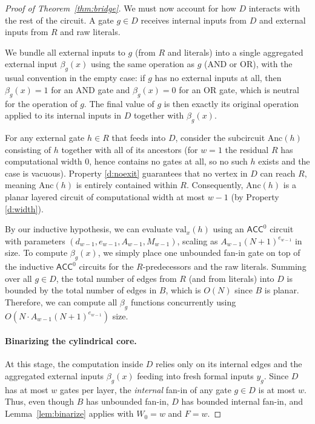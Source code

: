 \documentclass[11pt]{article}
\theoremstyle{definition}
\theoremstyle{remark}
\newcommand{\ACC}{\mathsf{ACC}^0}
\begin{document}
\begin{proof}[Proof of Theorem~\ref{thm:bridge}]
We must now account for how $D$ interacts with the rest of the circuit. A gate $g \in D$ receives internal inputs from $D$ and external inputs from $R$ and raw literals.

We bundle all external inputs to $g$ (from $R$ and literals) into a single aggregated external input $\beta_g(x)$ using the same operation as $g$ ($\mathrm{AND}$ or $\mathrm{OR}$), with the usual convention in the empty case: if $g$ has no external inputs at all, then $\beta_g(x)=1$ for an $\mathrm{AND}$ gate and $\beta_g(x)=0$ for an $\mathrm{OR}$ gate, which is neutral for the operation of $g$. The final value of $g$ is then exactly its original operation applied to its internal inputs in $D$ together with $\beta_g(x)$.

For any external gate $h \in R$ that feeds into $D$, consider the subcircuit $\mathrm{Anc}(h)$ consisting of $h$ together with all of its ancestors (for $w=1$ the residual $R$ has computational width $0$, hence contains no gates at all, so no such $h$ exists and the case is vacuous). Property \ref{d:noexit} guarantees that no vertex in $D$ can reach $R$, meaning $\mathrm{Anc}(h)$ is entirely contained within $R$. Consequently, $\mathrm{Anc}(h)$ is a planar layered circuit of computational width at most $w-1$ (by Property \ref{d:width}).

By our inductive hypothesis, we can evaluate $\mathrm{val}_x(h)$ using an $\ACC$ circuit with parameters $(d_{w-1},e_{w-1},A_{w-1},M_{w-1})$, scaling as $A_{w-1}(N+1)^{e_{w-1}}$ in size.
To compute $\beta_g(x)$, we simply place one unbounded fan-in gate on top of the inductive $\ACC$ circuits for the $R$-predecessors and the raw literals. Summing over all $g \in D$, the total number of edges from $R$ (and from literals) into $D$ is bounded by the total number of edges in $B$, which is $O(N)$ since $B$ is planar. Therefore, we can compute all $\beta_g$ functions concurrently using $O\left(N \cdot A_{w-1}(N+1)^{e_{w-1}}\right)$ size.

\paragraph{Binarizing the cylindrical core.}

At this stage, the computation inside $D$ relies only on its internal edges and the aggregated external inputs $\beta_g(x)$ feeding into fresh formal inputs $y_g$. Since $D$ has at most $w$ gates per layer, the \emph{internal} fan-in of any gate $g \in D$ is at most $w$. Thus, even though $B$ has unbounded fan-in, $D$ has bounded internal fan-in, and Lemma~\ref{lem:binarize} applies with $W_0=w$ and $F=w$.


\end{proof}
\end{document}
